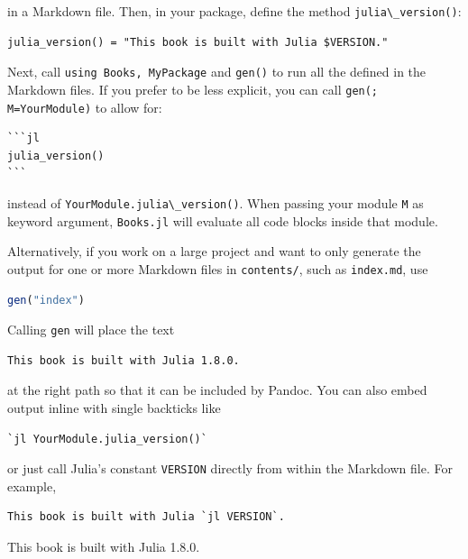 \documentclass[
  notoc %
]{tufte-book}
\newcommand{\passthrough}[1]{#1}
\begin{document}
in a Markdown file. Then, in your package, define the method
\passthrough{\lstinline!julia\_version()!}:

\begin{lstlisting}
julia_version() = "This book is built with Julia $VERSION."
\end{lstlisting}

Next, call \passthrough{\lstinline!using Books, MyPackage!} and
\passthrough{\lstinline!gen()!} to run all the defined in the Markdown
files. If you prefer to be less explicit, you can call
\passthrough{\lstinline!gen(; M=YourModule)!} to allow for:

\begin{lstlisting}
```jl
julia_version()
```
\end{lstlisting}

instead of \passthrough{\lstinline!YourModule.julia\_version()!}. When
passing your module \passthrough{\lstinline!M!} as keyword argument,
\passthrough{\lstinline!Books.jl!} will evaluate all code blocks inside
that module.

Alternatively, if you work on a large project and want to only generate
the output for one or more Markdown files in
\passthrough{\lstinline!contents/!}, such as
\passthrough{\lstinline!index.md!}, use

\begin{lstlisting}[language=Julia]
gen("index")
\end{lstlisting}

Calling \passthrough{\lstinline!gen!} will place the text

\begin{lstlisting}[language=Output]
This book is built with Julia 1.8.0.
\end{lstlisting}

at the right path so that it can be included by Pandoc. You can also
embed output inline with single backticks like

\begin{lstlisting}
`jl YourModule.julia_version()`
\end{lstlisting}

or just call Julia's constant \passthrough{\lstinline!VERSION!} directly
from within the Markdown file. For example,

\begin{lstlisting}
This book is built with Julia `jl VERSION`.
\end{lstlisting}

This book is built with Julia 1.8.0.
\end{document}
